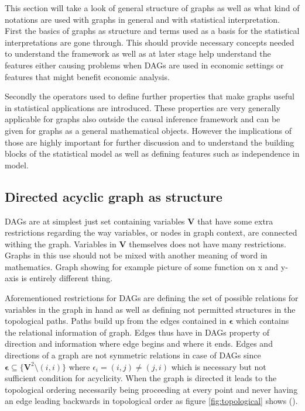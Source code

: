 \documentclass[main=english,12pt,a4paper,pdftex,econ,utf8]{aaltothesis}
\newcommand{\e}{\bm{\epsilon}}
\newcommand{\vars}{\bm{V}}
\begin{document}
This section will take a look of general structure of graphs as well as what kind of notations are used with graphs in general and with statistical interpretation. First the basics of graphs as structure and terms used as a basis for the statistical interpretations are gone through. This should provide necessary concepts needed to understand the framework as well as at later stage help understand the features either causing problems when DAGs are used in economic settings or features that might benefit economic analysis.

Secondly the operators used to define further properties that make graphs useful in statistical applications are introduced. These properties are very generally applicable for graphs also outside the causal inference framework and can be given for graphs as a general mathematical objects. However the implications of those are highly important for further discussion and to understand the building blocks of the statistical model as well as defining features such as independence in model.

\subsection{Directed acyclic graph as structure}

DAGs are at simplest just set containing variables $\vars$ that have some extra restrictions regarding the way variables, or nodes in graph context, are connected withing the graph. Variables in $\vars$ themselves does not have many restrictions. Graphs in this use should not be mixed with another meaning of word in mathematics. Graph showing for example picture of some function on x and y-axis is entirely different thing.

Aforementioned restrictions for DAGs are defining the set of possible relations for variables in the graph in hand as well as defining not permitted structures in the topological paths. Paths build up from the edges contained in $\e$ which contains the relational information of graph. Edges thus have in DAGs property of direction and information where edge begins and where it ends. Edges and directions of a graph are not symmetric relations in case of DAGs since $\e\subseteq \{\vars^2\setminus(i,i)\}$ where $\epsilon_i=(i,j)\neq(j,i)$ which is necessary but not sufficient condition for acyclicity. When the graph is directed it leads to the topological ordering necessarily being proceeding at every point and never having an edge leading backwards in topological order as figure \ref{fig:topological} shows (\cite{Peters2017}).
\end{document}
